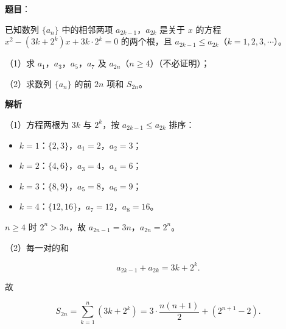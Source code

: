 \begin{answer}

\textbf{题目}：

已知数列 $\{a_n\}$ 中的相邻两项 $a_{2k-1}$，$a_{2k}$ 是关于 $x$ 的方程 $x^2-(3k+2^k)x+3k\cdot2^k=0$ 的两个根，且 $a_{2k-1}\leqslant a_{2k}$（$k=1,2,3,\cdots$）。

（1）求 $a_1$，$a_3$，$a_5$，$a_7$ 及 $a_{2n}$（$n\geqslant4$）（不必证明）；

（2）求数列 $\{a_n\}$ 的前 $2n$ 项和 $S_{2n}$。

\textbf{解析}

（1）方程两根为 $3k$ 与 $2^k$，按 $a_{2k-1}\leqslant a_{2k}$ 排序：

\begin{itemize}
\item $k=1$：$\{2,3\}$，$a_1=2$，$a_2=3$；
\item $k=2$：$\{4,6\}$，$a_3=4$，$a_4=6$；
\item $k=3$：$\{8,9\}$，$a_5=8$，$a_6=9$；
\item $k=4$：$\{12,16\}$，$a_7=12$，$a_8=16$。
\end{itemize}

$n\geqslant4$ 时 $2^n>3n$，故 $a_{2n-1}=3n$，$a_{2n}=2^n$。

（2）每一对的和

\nopagebreak[4]
\[a_{2k-1}+a_{2k}=3k+2^k.\]

故

\nopagebreak[4]
\[S_{2n}=\sum_{k=1}^n(3k+2^k)=3\cdot\frac{n(n+1)}2+(2^{n+1}-2).\]


\end{answer}
